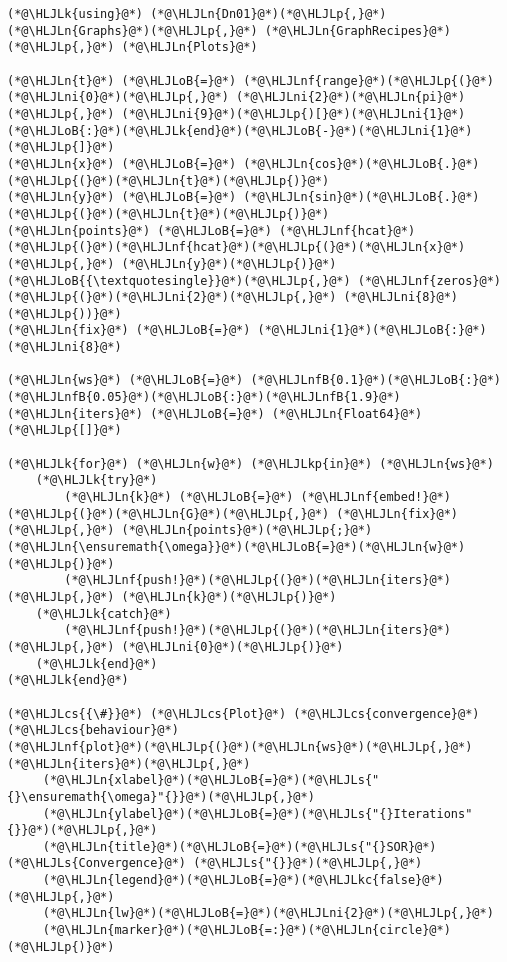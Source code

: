 \documentclass[12pt,a4paper]{article}
\newcommand{\HLJLk}[1]{\textcolor[RGB]{148,91,176}{\textbf{#1}}}
\newcommand{\HLJLkc}[1]{\textcolor[RGB]{59,151,46}{\textit{#1}}}
\newcommand{\HLJLkp}[1]{\textcolor[RGB]{148,91,176}{\textbf{#1}}}
\newcommand{\HLJLn}[1]{#1}
\newcommand{\HLJLnf}[1]{\textcolor[RGB]{66,102,213}{#1}}
\newcommand{\HLJLs}[1]{\textcolor[RGB]{201,61,57}{#1}}
\newcommand{\HLJLnfB}[1]{\textcolor[RGB]{59,151,46}{#1}}
\newcommand{\HLJLni}[1]{\textcolor[RGB]{59,151,46}{#1}}
\newcommand{\HLJLoB}[1]{\textcolor[RGB]{102,102,102}{\textbf{#1}}}
\newcommand{\HLJLp}[1]{#1}
\newcommand{\HLJLcs}[1]{\textcolor[RGB]{153,153,119}{\textit{#1}}}
\begin{document}
\begin{lstlisting}
(*@\HLJLk{using}@*) (*@\HLJLn{Dn01}@*)(*@\HLJLp{,}@*) (*@\HLJLn{Graphs}@*)(*@\HLJLp{,}@*) (*@\HLJLn{GraphRecipes}@*)(*@\HLJLp{,}@*) (*@\HLJLn{Plots}@*)

(*@\HLJLn{t}@*) (*@\HLJLoB{=}@*) (*@\HLJLnf{range}@*)(*@\HLJLp{(}@*)(*@\HLJLni{0}@*)(*@\HLJLp{,}@*) (*@\HLJLni{2}@*)(*@\HLJLn{pi}@*)(*@\HLJLp{,}@*) (*@\HLJLni{9}@*)(*@\HLJLp{)[}@*)(*@\HLJLni{1}@*)(*@\HLJLoB{:}@*)(*@\HLJLk{end}@*)(*@\HLJLoB{-}@*)(*@\HLJLni{1}@*)(*@\HLJLp{]}@*)
(*@\HLJLn{x}@*) (*@\HLJLoB{=}@*) (*@\HLJLn{cos}@*)(*@\HLJLoB{.}@*)(*@\HLJLp{(}@*)(*@\HLJLn{t}@*)(*@\HLJLp{)}@*)
(*@\HLJLn{y}@*) (*@\HLJLoB{=}@*) (*@\HLJLn{sin}@*)(*@\HLJLoB{.}@*)(*@\HLJLp{(}@*)(*@\HLJLn{t}@*)(*@\HLJLp{)}@*)
(*@\HLJLn{points}@*) (*@\HLJLoB{=}@*) (*@\HLJLnf{hcat}@*)(*@\HLJLp{(}@*)(*@\HLJLnf{hcat}@*)(*@\HLJLp{(}@*)(*@\HLJLn{x}@*)(*@\HLJLp{,}@*) (*@\HLJLn{y}@*)(*@\HLJLp{)}@*)(*@\HLJLoB{{\textquotesingle}}@*)(*@\HLJLp{,}@*) (*@\HLJLnf{zeros}@*)(*@\HLJLp{(}@*)(*@\HLJLni{2}@*)(*@\HLJLp{,}@*) (*@\HLJLni{8}@*)(*@\HLJLp{))}@*)
(*@\HLJLn{fix}@*) (*@\HLJLoB{=}@*) (*@\HLJLni{1}@*)(*@\HLJLoB{:}@*)(*@\HLJLni{8}@*)

(*@\HLJLn{ws}@*) (*@\HLJLoB{=}@*) (*@\HLJLnfB{0.1}@*)(*@\HLJLoB{:}@*)(*@\HLJLnfB{0.05}@*)(*@\HLJLoB{:}@*)(*@\HLJLnfB{1.9}@*)
(*@\HLJLn{iters}@*) (*@\HLJLoB{=}@*) (*@\HLJLn{Float64}@*)(*@\HLJLp{[]}@*)

(*@\HLJLk{for}@*) (*@\HLJLn{w}@*) (*@\HLJLkp{in}@*) (*@\HLJLn{ws}@*)
    (*@\HLJLk{try}@*)
        (*@\HLJLn{k}@*) (*@\HLJLoB{=}@*) (*@\HLJLnf{embed!}@*)(*@\HLJLp{(}@*)(*@\HLJLn{G}@*)(*@\HLJLp{,}@*) (*@\HLJLn{fix}@*)(*@\HLJLp{,}@*) (*@\HLJLn{points}@*)(*@\HLJLp{;}@*) (*@\HLJLn{\ensuremath{\omega}}@*)(*@\HLJLoB{=}@*)(*@\HLJLn{w}@*)(*@\HLJLp{)}@*)
        (*@\HLJLnf{push!}@*)(*@\HLJLp{(}@*)(*@\HLJLn{iters}@*)(*@\HLJLp{,}@*) (*@\HLJLn{k}@*)(*@\HLJLp{)}@*)
    (*@\HLJLk{catch}@*)
        (*@\HLJLnf{push!}@*)(*@\HLJLp{(}@*)(*@\HLJLn{iters}@*)(*@\HLJLp{,}@*) (*@\HLJLni{0}@*)(*@\HLJLp{)}@*)
    (*@\HLJLk{end}@*)
(*@\HLJLk{end}@*)

(*@\HLJLcs{{\#}}@*) (*@\HLJLcs{Plot}@*) (*@\HLJLcs{convergence}@*) (*@\HLJLcs{behaviour}@*)
(*@\HLJLnf{plot}@*)(*@\HLJLp{(}@*)(*@\HLJLn{ws}@*)(*@\HLJLp{,}@*) (*@\HLJLn{iters}@*)(*@\HLJLp{,}@*)
     (*@\HLJLn{xlabel}@*)(*@\HLJLoB{=}@*)(*@\HLJLs{"{}\ensuremath{\omega}"{}}@*)(*@\HLJLp{,}@*)
     (*@\HLJLn{ylabel}@*)(*@\HLJLoB{=}@*)(*@\HLJLs{"{}Iterations"{}}@*)(*@\HLJLp{,}@*)
     (*@\HLJLn{title}@*)(*@\HLJLoB{=}@*)(*@\HLJLs{"{}SOR}@*) (*@\HLJLs{Convergence}@*) (*@\HLJLs{"{}}@*)(*@\HLJLp{,}@*)
     (*@\HLJLn{legend}@*)(*@\HLJLoB{=}@*)(*@\HLJLkc{false}@*)(*@\HLJLp{,}@*)
     (*@\HLJLn{lw}@*)(*@\HLJLoB{=}@*)(*@\HLJLni{2}@*)(*@\HLJLp{,}@*)
     (*@\HLJLn{marker}@*)(*@\HLJLoB{=:}@*)(*@\HLJLn{circle}@*)(*@\HLJLp{)}@*)
\end{lstlisting}
\end{document}
